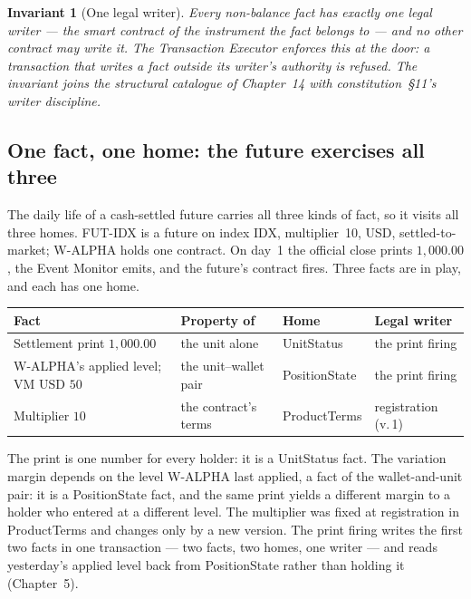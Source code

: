 \documentclass[11pt,a4paper]{article}
\newcommand{\USD}[1]{\mbox{USD~#1}}
\newtheorem{invariant}[definition]{Invariant}
\begin{document}
\begin{invariant}[One legal writer]\label{inv:one-writer}
Every non-balance fact has exactly one legal writer --- the smart contract of the
instrument the fact belongs to --- and no other contract may write it. The Transaction
Executor enforces this at the door: a transaction that writes a fact outside its writer's
authority is refused. The invariant joins the structural catalogue of
Chapter~14 with constitution~\S 11's writer discipline.
\end{invariant}

\subsection{One fact, one home: the future exercises all three}

The daily life of a cash-settled future carries all three kinds of fact, so it visits all
three homes. FUT-IDX is a future on index IDX, multiplier~10, USD, settled-to-market;
W-ALPHA holds one contract. On day~1 the official close prints $1{,}000.00$, the Event
Monitor emits, and the future's contract fires. Three facts are in play, and each has one
home.

\begin{center}
\begin{tabular}{llll}
\toprule
Fact & Property of & Home & Legal writer \\
\midrule
Settlement print $1{,}000.00$        & the unit alone         & UnitStatus    & the print firing \\
W-ALPHA's applied level; VM $\USD{50}$ & the unit--wallet pair & PositionState & the print firing \\
Multiplier $10$                      & the contract's terms   & ProductTerms  & registration (v.\,1) \\
\bottomrule
\end{tabular}
\end{center}

The print is one number for every holder: it is a UnitStatus fact. The variation margin
depends on the level W-ALPHA last applied, a fact of the wallet-and-unit pair: it is a
PositionState fact, and the same print yields a different margin to a holder who entered
at a different level. The multiplier was fixed at registration in ProductTerms and changes
only by a new version. The print firing writes the first two facts in one transaction ---
two facts, two homes, one writer --- and reads yesterday's applied level back from
PositionState rather than holding it (Chapter~5).
\end{document}
